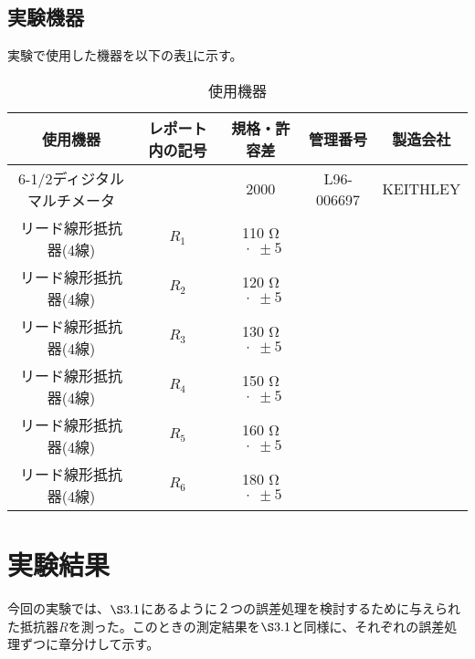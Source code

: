 \documentclass[10pt,a4paper]{jsarticle}
\numberwithin{equation}{section}
\numberwithin{figure}{section}
\numberwithin{table}{section}
\begin{document}
  \subsection{実験機器}
    実験で使用した機器を以下の表\ref{tab:使用機器}に示す。
    \begin{table}[H]
    \caption{使用機器}\label{tab:使用機器}
    \begin{center}
        \begin{tabular}{|c|c|c|c|c|}
          \hline
          使用機器&レポート内の記号&規格・許容差&管理番号&製造会社\\
          \hline
          6-1/2ディジタルマルチメータ&&2000&L96-006697&KEITHLEY\\
          \hline
          リード線形抵抗器(4線)&$R_1$ &110 $\si{\ohm}$$\;\cdot\;\pm 5$&&\\
          \hline
          リード線形抵抗器(4線)&$R_2$ &120 $\si{\ohm}$$\;\cdot\;\pm 5$&&\\
          \hline
          リード線形抵抗器(4線)&$R_3$ &130 $\si{\ohm}$$\;\cdot\;\pm 5$&&\\
          \hline
          リード線形抵抗器(4線)&$R_4$ &150 $\si{\ohm}$$\;\cdot\;\pm 5$&&\\
          \hline
          リード線形抵抗器(4線)&$R_5$ &160 $\si{\ohm}$$\;\cdot\;\pm 5$&&\\
          \hline
          リード線形抵抗器(4線)&$R_6$ &180 $\si{\ohm}$$\;\cdot\;\pm 5$&&\\
          \hline
          
        \end{tabular}
    \end{center}
    \end{table}
\section{実験結果}
  今回の実験では、$\S3.1$にあるように２つの誤差処理を検討するために与えられた抵抗器$R$を測った。このときの測定結果を$\S3.1$と同様に、それぞれの誤差処理ずつに章分けして示す。
\end{document}
